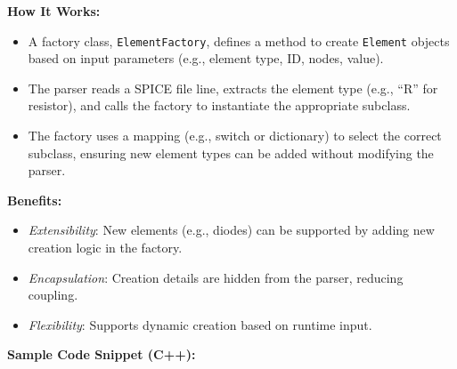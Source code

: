 \documentclass{article}
\begin{document}
\textbf{How It Works:}
\begin{itemize}
    \item A factory class, \texttt{ElementFactory}, defines a method to create \texttt{Element} objects based on input parameters (e.g., element type, ID, nodes, value).
    \item The parser reads a SPICE file line, extracts the element type (e.g., “R” for resistor), and calls the factory to instantiate the appropriate subclass.
    \item The factory uses a mapping (e.g., switch or dictionary) to select the correct subclass, ensuring new element types can be added without modifying the parser.
\end{itemize}

\textbf{Benefits:}
\begin{itemize}
    \item \textit{Extensibility}: New elements (e.g., diodes) can be supported by adding new creation logic in the factory.
    \item \textit{Encapsulation}: Creation details are hidden from the parser, reducing coupling.
    \item \textit{Flexibility}: Supports dynamic creation based on runtime input.
\end{itemize}

\textbf{Sample Code Snippet (C++):}
\end{document}
